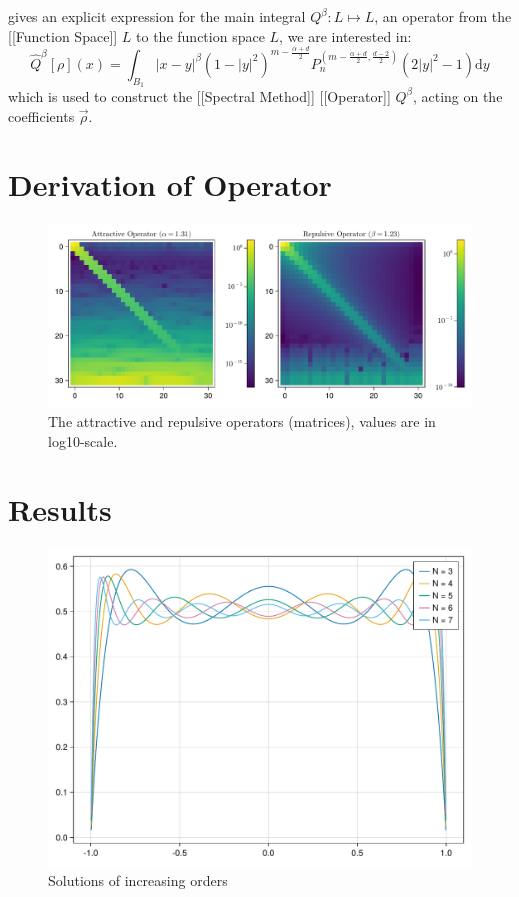  gives an explicit expression for the main integral
\(Q^{\beta}: L \mapsto L\), an operator from the {[}{[}Function
Space{]}{]} \(L\) to the function space \(L\), we are interested in:
\[\hat{Q}^{\beta}[\rho](x) = \int_{B_1} |x-y|^\beta (1-|y|^2)^{m-\frac{\alpha+d}{2}} P_n^{(m-
  \frac{\alpha+d}{2},\frac{d-2}{2})}(2|y|^2-1) \mathrm{d}y\] which is used
to construct the {[}{[}Spectral Method{]}{]} {[}{[}Operator{]}{]}
\(Q^\beta\), acting on the coefficients \(\vec{\rho}\).

\section{Derivation of Operator}


\begin{figure}[H]
  \centering
  \label{fig:attractive-repulsive}
  \includegraphics[width=\linewidth]{../figures/results/attractive-repulsive-operator.pdf}
  \caption{The attractive and repulsive operators (matrices), values are in log10-scale.}
\end{figure}

\section{Results}
\begin{figure}[H]
  \centering
  \label{fig:solution-increasing-order}
  \includegraphics[width=0.8\linewidth]{../figures/results/solution-increasing-order.pdf}
  \caption{Solutions of increasing orders}
\end{figure}

